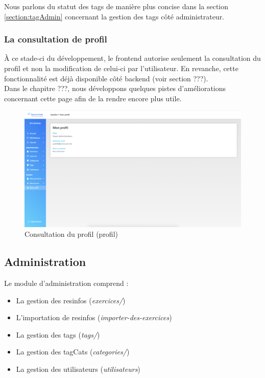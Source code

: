 Nous parlons du statut des \glspl{tag} de manière plus concise dans la section \ref{section:tagAdmin} concernant la gestion des \glspl{tag} côté administrateur.

\subsubsection{La consultation de profil}

À ce stade-ci du développement, le \gls{frontend} autorise seulement la consultation du profil et non la modification de celui-ci par l'utilisateur. En revanche, cette fonctionnalité est déjà disponible côté backend (voir section ???).\\

Dans le chapitre ???, nous développons quelques pistes d'améliorations concernant cette page afin de la rendre encore plus utile.

\begin{figure}[H]
    \includegraphics[width=\textwidth,height=\textheight,keepaspectratio]{images/client/profile.png}
    \caption[SourceCode : profil]{Consultation du profil (profil)}
\end{figure}

\subsection{Administration}

Le module d'administration comprend :

\begin{itemize}
    \item La gestion des \glspl{resinfo} (\textit{exercices/})
    \item L'importation de \glspl{resinfo} (\textit{importer-des-exercices})
    \item La gestion des \glspl{tag} (\textit{tags/})
    \item La gestion des \glspl{tagCat} (\textit{categories/})
    \item La gestion des utilisateurs (\textit{utilisateurs})
\end{itemize}

